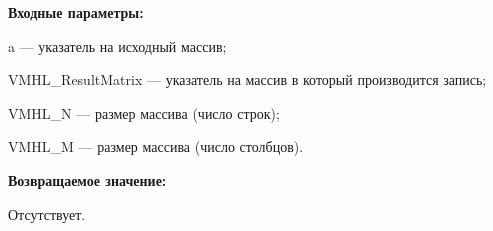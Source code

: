 \textbf{Входные параметры:}  
 
a --- указатель на исходный массив;
 
VMHL\_ResultMatrix --- указатель на массив в который производится запись;
 
VMHL\_N --- размер массива (число строк);
 
VMHL\_M --- размер массива (число столбцов).

\textbf{Возвращаемое значение:}

Отсутствует.